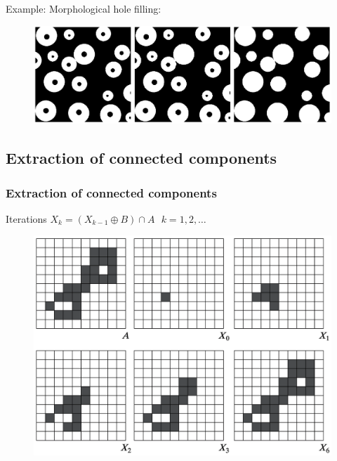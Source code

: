 \begin{frame}
Example: Morphological hole filling:
\begin{figure}[!h]
\includegraphics[width=\textwidth]{ex-9-16.png}
\end{figure}
\end{frame}

\subsection{Extraction of connected components}

\begin{frame}
\frametitle{Extraction of connected components}
Iterations $X_{k} = \left ( X_{k-1} \oplus B \right ) \cap A\ \ \ k=1,2,\ldots$
\begin{figure}[!h]
\includegraphics[width=.7\textwidth]{fig-9-17}
\end{figure}
\end{frame}

